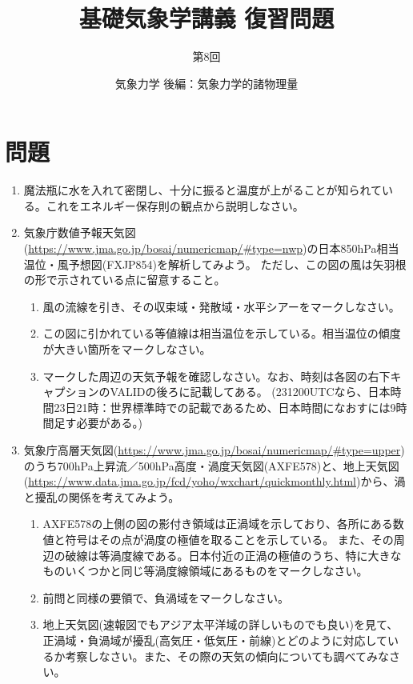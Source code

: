 \documentclass{jsarticle}
\newenvironment{problems}
{
  \renewcommand\labelenumi{\doublebox{\arabic{enumi}}}
  \begin{enumerate}
}{
  \end{enumerate}
  \renewcommand\labelenumi{\arabic{enumi}.}
}
\begin{document}
\title{基礎気象学講義 復習問題} %
\author{第8回} %
\date{気象力学 後編：気象力学的諸物理量} %
\maketitle

\section{問題}

    \begin{problems}
    \item 魔法瓶に水を入れて密閉し、十分に振ると温度が上がることが知られている。これをエネルギー保存則の観点から説明しなさい。\\

    \item 気象庁数値予報天気図(\url{https://www.jma.go.jp/bosai/numericmap/#type=nwp})の日本850hPa相当温位・風予想図(FXJP854)を解析してみよう。
          ただし、この図の風は矢羽根の形で示されている点に留意すること。
        \begin{enumerate}[(1)]
        \item 風の流線を引き、その収束域・発散域・水平シアーをマークしなさい。
        \item この図に引かれている等値線は相当温位を示している。相当温位の傾度が大きい箇所をマークしなさい。
        \item マークした周辺の天気予報を確認しなさい。なお、時刻は各図の右下キャプションのVALIDの後ろに記載してある。
        (231200UTCなら、日本時間23日21時：世界標準時での記載であるため、日本時間になおすには9時間足す必要がある。)\\
        \end{enumerate}


    \item 気象庁高層天気図(\url{https://www.jma.go.jp/bosai/numericmap/#type=upper})のうち700hPa上昇流／500hPa高度・渦度天気図(AXFE578)と、地上天気図(\url{https://www.data.jma.go.jp/fcd/yoho/wxchart/quickmonthly.html})から、渦と擾乱の関係を考えてみよう。
        \begin{enumerate}[(1)]
        \item AXFE578の上側の図の影付き領域は正渦域を示しており、各所にある数値と符号はその点が渦度の極値を取ることを示している。
        また、その周辺の破線は等渦度線である。日本付近の正渦の極値のうち、特に大きなものいくつかと同じ等渦度線領域にあるものをマークしなさい。
        \item 前問と同様の要領で、負渦域をマークしなさい。
        \item 地上天気図(速報図でもアジア太平洋域の詳しいものでも良い)を見て、正渦域・負渦域が擾乱(高気圧・低気圧・前線)とどのように対応しているか考察しなさい。また、その際の天気の傾向についても調べてみなさい。
        \end{enumerate}

\end{problems}
\end{document}
